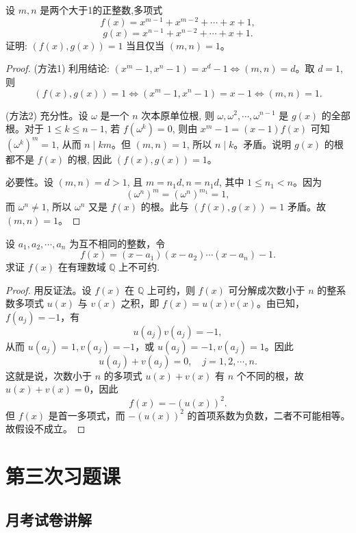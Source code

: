 \documentclass[lang=cn,12pt]{elegantbook}
\begin{document}
\begin{example}
设 \( m,n \) 是两个大于1的正整数,多项式
\[ f(x) = x^{m-1} + x^{m-2} + \cdots + x + 1, \]
\[ g(x) = x^{n-1} + x^{n-2} + \cdots + x + 1. \]
证明: \( (f(x),g(x))=1 \) 当且仅当 \( (m,n)=1 \)。
\end{example}

\begin{proof}
(方法1) 利用结论: \( (x^m-1,x^n-1)=x^d-1 \iff (m,n)=d \)。取 \( d=1 \), 则
\[ (f(x),g(x))=1 \iff (x^m-1,x^n-1)=x-1 \iff (m,n)=1. \]

(方法2) 充分性。设 \( \omega \) 是一个 \( n \) 次本原单位根, 则 \( \omega, \omega^2, \cdots, \omega^{n-1} \) 是 \( g(x) \) 的全部根。对于 \( 1 \leq k \leq n-1 \), 若 \( f(\omega^k)=0 \), 则由 \( x^m-1=(x-1)f(x) \) 可知 \( (\omega^k)^m=1 \), 从而 \( n \mid km \)。但 \( (m,n)=1 \), 所以 \( n \mid k \)。矛盾。说明 \( g(x) \) 的根都不是 \( f(x) \) 的根, 因此 \( (f(x),g(x))=1 \)。

必要性。设 \( (m,n)=d>1 \), 且 \( m=n_1d,n=n_1d \), 其中 \( 1 \leq n_1<n \)。因为
\[ (\omega^n)^m=(\omega^n)^{m_1}=1, \]
而 \( \omega^n \neq 1 \), 所以 \( \omega^n \) 又是 \( f(x) \) 的根。此与 \( (f(x),g(x))=1 \) 矛盾。故 \( (m,n)=1 \)。
\end{proof}

\begin{example}
设 \(a_1, a_2, \cdots, a_n\) 为互不相同的整数，令 
\[ f(x) = (x - a_1)(x - a_2)\cdots(x - a_n) - 1. \]
求证 \(f(x)\) 在有理数域 \(\mathbb{Q}\) 上不可约.
\end{example}

\begin{proof}
用反证法。设 \(f(x)\) 在 \(\mathbb{Q}\) 上可约，则 \(f(x)\) 可分解成次数小于 \(n\) 的整系数多项式 \(u(x)\) 与 \(v(x)\) 之积，即 \(f(x) = u(x)v(x)\)。由已知，\(f(a_j) = -1\)，有 
\[ u(a_j)v(a_j) = -1, \] 
从而 \(u(a_j) = 1, v(a_j) = -1\)，或 \(u(a_j) = -1, v(a_j) = 1\)。因此 
\[ u(a_j) + v(a_j) = 0, \quad j = 1, 2, \cdots, n. \] 
这就是说，次数小于 \(n\) 的多项式 \(u(x) + v(x)\) 有 \(n\) 个不同的根，故 \(u(x) + v(x) = 0\)，因此 
\[ f(x) = -(u(x))^2. \] 
但 \(f(x)\) 是首一多项式，而 \(-(u(x))^2\) 的首项系数为负数，二者不可能相等。故假设不成立。
\end{proof}

\chapter{第三次习题课}
\section{月考试卷讲解}
\end{document}
